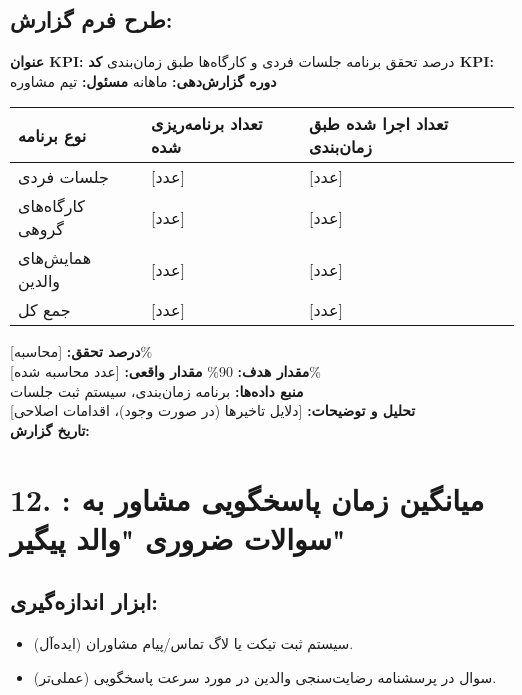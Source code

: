 \documentclass[11pt]{article}
\begin{document}
\subsection*{طرح فرم گزارش:}
\noindent\textbf{عنوان KPI:} درصد تحقق برنامه جلسات فردی و کارگاه‌ها طبق زمان‌بندی \hfill \textbf{کد KPI:}  \\
\noindent\textbf{دوره گزارش‌دهی:} ماهانه \hfill \textbf{مسئول:} تیم مشاوره \\

\bigskip
\begin{tabular}{lll}
\textbf{نوع برنامه} & \textbf{تعداد برنامه‌ریزی شده} & \textbf{تعداد اجرا شده طبق زمان‌بندی} \\
\hline
جلسات فردی & {[عدد]} & {[عدد]} \\
کارگاه‌های گروهی & {[عدد]} & {[عدد]} \\
همایش‌های والدین & {[عدد]} & {[عدد]} \\
جمع کل & {[عدد]} & {[عدد]} \\
\end{tabular}
\bigskip

\noindent\textbf{درصد تحقق:} {[محاسبه]\%} \\
\noindent\textbf{مقدار هدف:} 90\% \hfill \textbf{مقدار واقعی:} {[عدد محاسبه شده]\%} \\
\noindent\textbf{منبع داده‌ها:} برنامه زمان‌بندی، سیستم ثبت جلسات \\
\noindent\textbf{تحلیل و توضیحات:} {[دلایل تاخیرها (در صورت وجود)، اقدامات اصلاحی]} \\
\noindent\textbf{تاریخ گزارش:} \\

\hrulefill
\bigskip

\section*{12. : میانگین زمان پاسخگویی مشاور به سوالات ضروری "والد پیگیر"}

\subsection*{ابزار اندازه‌گیری:}
\begin{itemize}
    \item (ایده‌آل) سیستم ثبت تیکت یا لاگ تماس/پیام مشاوران.
    \item (عملی‌تر) سوال در پرسشنامه رضایت‌سنجی والدین در مورد سرعت پاسخگویی.
\end{itemize}
\end{document}
